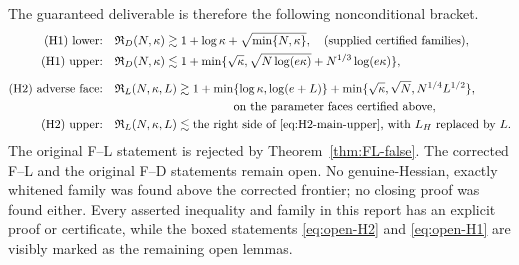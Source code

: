 \documentclass[11pt]{article}
\numberwithin{equation}{section}
\newcommand{\cR}{\mathfrak R}
\begin{document}
The guaranteed deliverable is therefore the following nonconditional
bracket.
\begin{align*}
 \text{(H1) lower:}\quad
 &\cR_D(N,\kappa)\gtrsim
 1+\log\kappa+\sqrt{\min\{N,\kappa\}},
 \quad\text{(supplied certified families)},\\
 \text{(H1) upper:}\quad
 &\cR_D(N,\kappa)\lesssim
 1+\min\{\sqrt\kappa,
 \sqrt{N\log(e\kappa)}+N^{1/3}\log(e\kappa)\},\\[2mm]
 \text{(H2) adverse face:}\quad
 &\cR_L(N,\kappa,L)\gtrsim
 1+\min\{\log\kappa,\log(e+L)\}
 +\min\{\sqrt\kappa,\sqrt N,N^{1/4}L^{1/2}\},\\
 &\hspace{35mm}\text{on the parameter faces certified above},\\
 \text{(H2) upper:}\quad
 &\cR_L(N,\kappa,L)\lesssim \text{the right side of
 \eqref{eq:H2-main-upper}, with $L_H$ replaced by $L$}.
\end{align*}
The original F--L statement is rejected by Theorem~\ref{thm:FL-false}.
The corrected F--L and the original F--D statements remain open.  No
genuine-Hessian, exactly whitened family was found above the corrected
frontier; no closing proof was found either.  Every asserted inequality and
family in this report has an explicit proof or certificate, while the boxed
statements \eqref{eq:open-H2} and \eqref{eq:open-H1} are visibly marked as
the remaining open lemmas.
\end{document}
